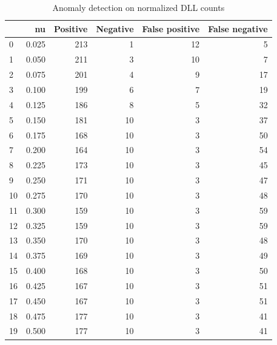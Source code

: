 \documentclass[a4paper,twoside,12pt]{book}
\begin{document}
\begin{appendices}
\begin{table}
	\centering
	\caption{Anomaly detection on normalized DLL counts}
	\label{id:tab:countOCSVM}
	\begin{tabular}{lrrrrr}
		\toprule
		{} &     nu &  Positive &  Negative &  False positive &  False negative \\
		\midrule
		0  &  0.025 &       213 &         1 &              12 &               5 \\
		1  &  0.050 &       211 &         3 &              10 &               7 \\
		2  &  0.075 &       201 &         4 &               9 &              17 \\
		3  &  0.100 &       199 &         6 &               7 &              19 \\
		4  &  0.125 &       186 &         8 &               5 &              32 \\
		5  &  0.150 &       181 &        10 &               3 &              37 \\
		6  &  0.175 &       168 &        10 &               3 &              50 \\
		7  &  0.200 &       164 &        10 &               3 &              54 \\
		8  &  0.225 &       173 &        10 &               3 &              45 \\
		9  &  0.250 &       171 &        10 &               3 &              47 \\
		10 &  0.275 &       170 &        10 &               3 &              48 \\
		11 &  0.300 &       159 &        10 &               3 &              59 \\
		12 &  0.325 &       159 &        10 &               3 &              59 \\
		13 &  0.350 &       170 &        10 &               3 &              48 \\
		14 &  0.375 &       169 &        10 &               3 &              49 \\
		15 &  0.400 &       168 &        10 &               3 &              50 \\
		16 &  0.425 &       167 &        10 &               3 &              51 \\
		17 &  0.450 &       167 &        10 &               3 &              51 \\
		18 &  0.475 &       177 &        10 &               3 &              41 \\
		19 &  0.500 &       177 &        10 &               3 &              41 \\

\end{tabular}
\end{table}
\end{appendices}
\end{document}
